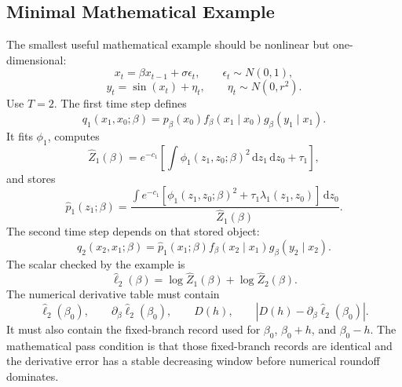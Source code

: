 \documentclass[11pt]{article}
\numberwithin{equation}{section}
\newcommand{\dd}{\,\mathrm d}
\newcommand{\widehatell}{\widehat\ell}
\begin{document}
\subsection{Minimal Mathematical Example}

The smallest useful mathematical example should be nonlinear but one-dimensional:
\begin{equation}
    x_t=\beta x_{t-1}+\sigma\epsilon_t,
    \qquad
    \epsilon_t\sim N(0,1),
    \label{eq:p24-p19-102}
\end{equation}
\begin{equation}
    y_t=\sin(x_t)+\eta_t,
    \qquad
    \eta_t\sim N(0,r^2).
    \label{eq:p24-p19-103}
\end{equation}
Use \(T=2\).  The first time step defines
\begin{equation}
    q_1(x_1,x_0;\beta)
    =
    p_\beta(x_0)
    f_\beta(x_1\mid x_0)
    g_\beta(y_1\mid x_1).
    \label{eq:p24-p19-104}
\end{equation}
It fits \(\phi_1\), computes
\begin{equation}
    \widehat Z_1(\beta)=e^{-c_1}\left[
    \int \phi_1(z_1,z_0;\beta)^2
    \dd z_1\dd z_0+\tau_1
    \right],
    \label{eq:p24-p19-105}
\end{equation}
and stores
\begin{equation}
    \widehat p_1(z_1;\beta)
    =
    \frac{\int
    e^{-c_1}\left[
    \phi_1(z_1,z_0;\beta)^2+\tau_1\lambda_1(z_1,z_0)
    \right]
    \dd z_0}
    {\widehat Z_1(\beta)}.
    \label{eq:p24-p19-106}
\end{equation}
The second time step depends on that stored object:
\begin{equation}
    q_2(x_2,x_1;\beta)
    =
    \widehat p_1(x_1;\beta)
    f_\beta(x_2\mid x_1)
    g_\beta(y_2\mid x_2).
    \label{eq:p24-p19-107}
\end{equation}
The scalar checked by the example is
\begin{equation}
    \widehatell_2(\beta)
    =
    \log\widehat Z_1(\beta)
    +
    \log\widehat Z_2(\beta).
    \label{eq:p24-p19-108}
\end{equation}
The numerical derivative table must contain
\begin{equation}
    \widehatell_2(\beta_0),
    \qquad
    \partial_\beta\widehatell_2(\beta_0),
    \qquad
    D(h),
    \qquad
    |D(h)-\partial_\beta\widehatell_2(\beta_0)|.
    \label{eq:p24-p19-109}
\end{equation}
It must also contain the fixed-branch record used for \(\beta_0\),
\(\beta_0+h\), and \(\beta_0-h\).  The mathematical pass condition is that
those fixed-branch records are identical and the derivative error has a stable
decreasing window before numerical roundoff dominates.
\end{document}
